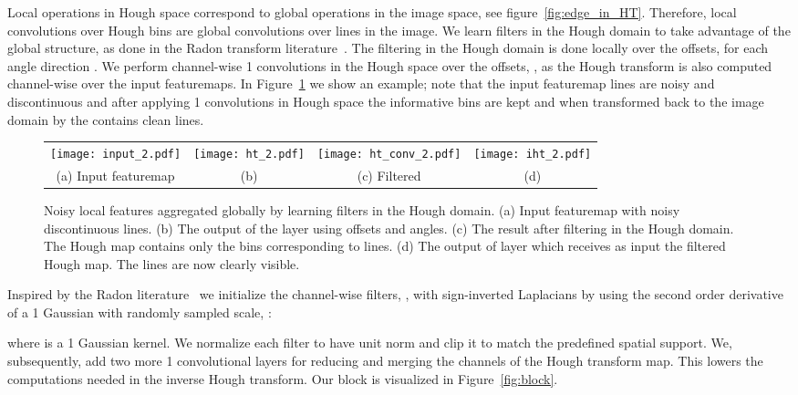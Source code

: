 \documentclass[runningheads]{llncs}
\begin{document}
Local operations in Hough space correspond to global operations in the image space, see figure~\ref{fig:edge_in_HT}. Therefore, local convolutions over Hough bins are global convolutions over lines in the image.
We learn filters in the Hough domain to take advantage of the global structure, as done in the Radon transform literature~\cite{magnusson1993linogram}. The filtering in the Hough domain is done locally over the offsets, for each angle direction \cite{nikolaev2008hough,wei2019x}.
We perform channel-wise 1 convolutions in the Hough space over the offsets, , as the Hough transform is also computed channel-wise over the input featuremaps.  In Figure~\ref{fig:conv} we show an example; note that the input featuremap lines are noisy and discontinuous and after applying 1 convolutions in Hough space the informative bins are kept and when transformed back to the image domain by the  contains clean lines.  
\begin{figure}[t!]
    \centering
    \begin{tabular}{c@{\hskip 0.25 in}c@{\hskip 0.10 in}c@{\hskip 0.10 in}c}
    \texttt{[image: input\_2.pdf]} &
    \texttt{[image: ht\_2.pdf]} &
    \texttt{[image: ht\_conv\_2.pdf]} &
    \texttt{[image: iht\_2.pdf]} \\
    (a) Input featuremap & (b)  & (c) Filtered  & (d) \\
    \end{tabular}
    \caption{ Noisy local features aggregated globally by learning filters in the Hough domain. 
    (a) Input featuremap with noisy discontinuous lines. 
    (b) The output of the  layer using  offsets and  angles. 
    (c) The result after filtering in the Hough domain. The Hough map contains only the bins corresponding to lines.
    (d) The output of  layer which receives as input the filtered Hough map. The lines are now clearly visible.}
    \label{fig:conv}
\end{figure}

Inspired by the Radon literature~\cite{magnusson1993linogram,nikolaev2008hough,wei2019x} we initialize the channel-wise filters, , with sign-inverted Laplacians by using the second order derivative of a 1 Gaussian with randomly sampled scale, :  

where  is a 1 Gaussian kernel. 
We normalize each filter to have unit  norm and clip it to match the predefined spatial support. 
We, subsequently, add two more 1 convolutional layers for reducing and merging the channels of the Hough transform map.
This lowers the computations needed in the inverse Hough transform. Our block is visualized in Figure~\ref{fig:block}.
\end{document}
